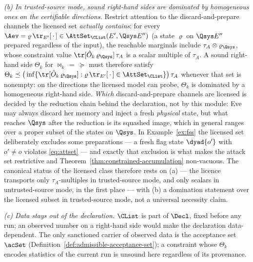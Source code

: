 \begin{remark}
\emph{(b) In trusted-source mode, sound right-hand sides are dominated
by homogeneous ones on the certifiable directions.} Restrict attention
to the discard-and-prepare channels the licensed set \emph{actually
contains}: for every
$\Aev=\varrho\,\tr_{E'}[\,\cdot\,]\in\AttSet_{\CList}(E',\Qsys E'')$
(a state $\varrho$ on $\Qsys E''$ prepared regardless of the input),
the reachable marginals include $\tau_A\otimes\varrho_{\Qsys}$, whose
constraint value $\tr[\hat O_k\,\varrho_{\Qsys}]\,\tau_A$ is a scalar
multiple of $\tau_A$. A sound right-hand side $\Theta_k$ for
$\bowtie_k\,=\,\succeq$ must therefore satisfy
$\Theta_k\preceq\big(\inf\{\tr[\hat O_k\,\varrho_{\Qsys}]:
\varrho\,\tr_{E'}[\,\cdot\,]\in\AttSet_{\CList}\}\big)\,\tau_A$
whenever that set is nonempty: on the directions the licensed model
can probe, $\Theta_k$ is dominated by a homogeneous right-hand side.
\emph{Which} discard-and-prepare channels are licensed is decided by the
reduction chain behind the declaration, not by this module: Eve may
always discard her memory and inject a fresh \emph{physical} state, but what
reaches $\Qsys$ after the reduction is its squashed image, which in
general ranges over a proper subset of the states on $\Qsys$. In
Example~\ref{ex:fss} the licensed set deliberately excludes some
preparations --- a fresh flag state $\dyad{o'}$ with $o'\ne o$
violates \eqref{eq:attset} --- and exactly that exclusion is what
makes the attack set restrictive and
Theorem~\ref{thm:constrained-accumulation} non-vacuous. The canonical status
of the licensed class therefore rests on (a) --- the licence transports only
$\tau_A$-multiples in trusted-source mode, and only scalars in
untrusted-source mode, in the first place --- with (b) a domination statement
over the licensed subset in trusted-source mode, not a universal necessity
claim.

\emph{(c) Data stays out of the declaration.} $\CList$ is
part of $\Decl$, fixed before any run; an observed number on a
right-hand side would make the declaration data-dependent. The only
sanctioned carrier of observed data is the acceptance set $\acSet$
(Definition~\ref{def:admissible-acceptance-set}); a constraint whose $\Theta_k$ encodes
statistics of the current run is unsound here regardless of its
provenance.
\end{remark}
